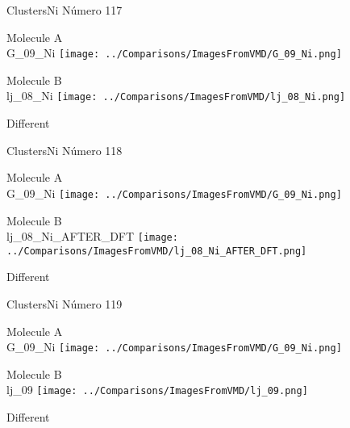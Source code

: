 \vtab[-3cm]
\begin{center}
{\large ClustersNi \tab Número 117}
\end{center}
\begin{multicols}{2}
\begin{center}
Molecule A \\ 
G\_09\_Ni
\texttt{[image: ../Comparisons/ImagesFromVMD/G\_09\_Ni.png]}
\\
\vtab

\columnbreak
Molecule B \\ 
lj\_08\_Ni
\texttt{[image: ../Comparisons/ImagesFromVMD/lj\_08\_Ni.png]}
\\
\vtab


\end{center}
\end{multicols}
\begin{center}
\textcolor{NavyBlue}{\Large Different}
\end{center}

 \newpage

\vtab[-3cm]
\begin{center}
{\large ClustersNi \tab Número 118}
\end{center}
\begin{multicols}{2}
\begin{center}
Molecule A \\ 
G\_09\_Ni
\texttt{[image: ../Comparisons/ImagesFromVMD/G\_09\_Ni.png]}
\\
\vtab

\columnbreak
Molecule B \\ 
lj\_08\_Ni\_AFTER\_DFT
\texttt{[image: ../Comparisons/ImagesFromVMD/lj\_08\_Ni\_AFTER\_DFT.png]}
\\
\vtab


\end{center}
\end{multicols}
\begin{center}
\textcolor{NavyBlue}{\Large Different}
\end{center}

 \newpage

\vtab[-3cm]
\begin{center}
{\large ClustersNi \tab Número 119}
\end{center}
\begin{multicols}{2}
\begin{center}
Molecule A \\ 
G\_09\_Ni
\texttt{[image: ../Comparisons/ImagesFromVMD/G\_09\_Ni.png]}
\\
\vtab

\columnbreak
Molecule B \\ 
lj\_09
\texttt{[image: ../Comparisons/ImagesFromVMD/lj\_09.png]}
\\
\vtab


\end{center}
\end{multicols}
\begin{center}
\textcolor{NavyBlue}{\Large Different}
\end{center}

